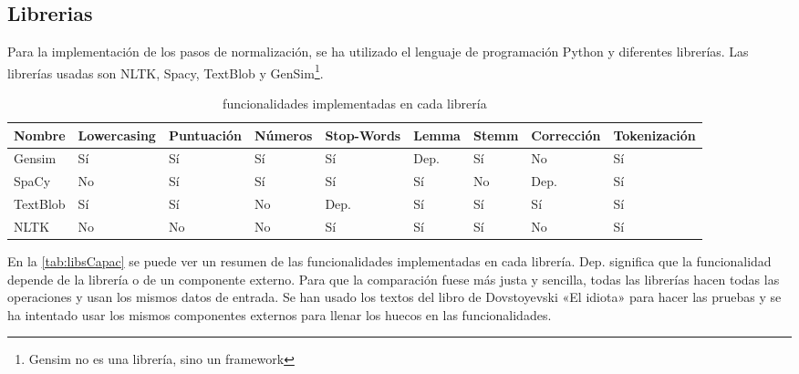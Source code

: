\documentclass[a4paper,twocolumn]{article}
\begin{document}
    \subsection{Librerias}\label{subsec:libs}
    Para la implementación de los pasos de normalización, se ha utilizado el lenguaje de programación Python y diferentes librerías.
    Las librerías usadas son NLTK, Spacy, TextBlob y GenSim\footnote{Gensim no es una librería, sino un framework}.

    \begin{table}[h]
        \centering

        \begin{adjustbox}{max width=\textwidth/2}

            \begin{tabular}{lllllllll}
                \toprule
                \textbf{Nombre} & \textbf{Lowercasing} & \textbf{Puntuación} & \textbf{Números} & \textbf{Stop-Words} & \textbf{Lemma} & \textbf{Stemm} & \textbf{Corrección} & \textbf{Tokenización} \\
                \midrule
                Gensim & Sí & Sí & Sí & Sí & Dep.
                & Sí & No & Sí \\
                SpaCy & No & Sí & Sí & Sí & Sí & No & Dep.
                & Sí \\
                TextBlob & Sí & Sí & No & Dep.
                & Sí & Sí & Sí & Sí \\
                NLTK            & No                   & No                  & No               & Sí                  & Sí             & Sí             & No                  & Sí                    \\
                \bottomrule
            \end{tabular}
        \end{adjustbox}
        \caption{funcionalidades implementadas en cada librería}
        \label{tab:libsCapac}
    \end{table}


    En la \autoref{tab:libsCapac} se puede ver un resumen de las funcionalidades implementadas en cada librería.
    Dep.
    significa que la funcionalidad depende de la librería o de un componente externo.
    Para que la comparación fuese más justa y sencilla, todas las librerías hacen todas las operaciones y usan los mismos datos de entrada.
    Se han usado los textos del libro de Dovstoyevski «El idiota»\cite{Dovstoyevski.theidiot} para hacer las pruebas y se ha intentado usar los mismos componentes externos para llenar los huecos en las funcionalidades.
\end{document}
